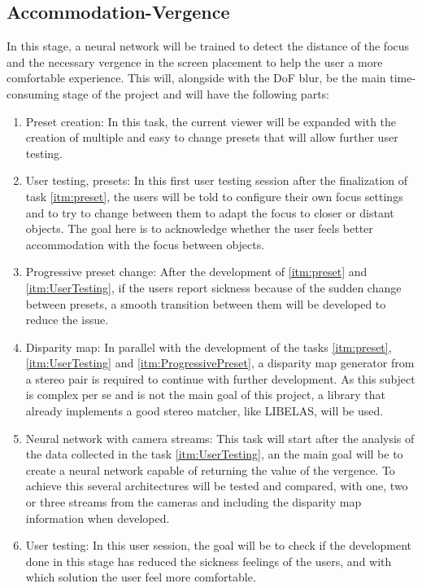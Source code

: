 \documentclass[10pt,a4paper,twocolumn,twoside]{article}
\begin{document}
	
	\subsection{Accommodation-Vergence}
	\label{subsec:vergence}
	In this stage, a neural network will be trained to detect the distance of the focus and the necessary vergence in the screen placement to help the user a more comfortable experience.
	This will, alongside with the DoF blur, be the main time-consuming stage of the project and will have the following parts:
	\begin{enumerate}
		\item \label{itm:preset}  Preset creation: In this task, the current viewer will be expanded with the creation of multiple and easy to change presets that will allow further user testing.
		
		\item \label{itm:UserTesting} User testing, presets: In this first user testing session after the finalization of task \ref{itm:preset}, the users will be told to configure their own focus settings and to try to change between them to adapt the focus to closer or distant objects. The goal here is to acknowledge whether the user feels better accommodation with the focus between objects.
		
		\item \label{itm:ProgressivePreset} Progressive preset change: After the development of \ref{itm:preset} and \ref{itm:UserTesting}, if the users report sickness because of the sudden change between presets, a smooth transition between them will be developed to reduce the issue. 
		
		\item Disparity map: In parallel with the development of the tasks \ref{itm:preset}, \ref{itm:UserTesting} and \ref{itm:ProgressivePreset}, a disparity map generator from a stereo pair is required to continue with further development. As this subject is complex per se and is not the main goal of this project, a library that already implements a good stereo matcher, like LIBELAS\cite{web:LIBELAS}, will be used. 
		
		\item Neural network with camera streams: This task will start after the analysis of the data collected in the task \ref{itm:UserTesting}, an the main goal will be to create a neural network capable of returning the value of the vergence. To achieve this several architectures will be tested and compared, with one, two or three streams from the cameras and including the disparity map information when developed.
		
		\item User testing: In this user session, the goal will be to check if the development done in this stage has reduced the sickness feelings of the users, and with which solution the user feel more comfortable.
	\end{enumerate}
	
\end{document}

